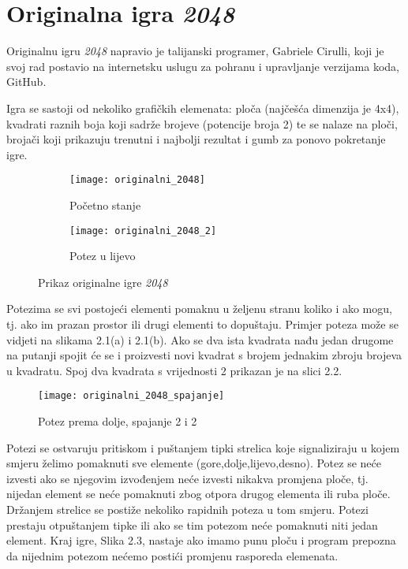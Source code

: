 \section{Originalna igra \textit{2048}}
Originalnu igru \textit{2048} napravio je talijanski programer, Gabriele Cirulli, koji je svoj rad \cite{2048og} postavio na internetsku uslugu za pohranu i upravljanje verzijama koda, GitHub.\par 
Igra se sastoji od nekoliko grafičkih elemenata: ploča (najčešća dimenzija je 4x4), kvadrati raznih boja koji sadrže brojeve (potencije broja 2) te se nalaze na ploči, brojači koji prikazuju trenutni i  najbolji rezultat i gumb za ponovo pokretanje igre.\newline
	\begin{figure}[h]
		\begin{subfigure}{0.5\textwidth}
			\texttt{[image: originalni\_2048]} 
			\caption{Početno stanje}
		\end{subfigure}
		\begin{subfigure}{0.5\textwidth}
			\texttt{[image: originalni\_2048\_2]}
			\caption{Potez u lijevo}
		\end{subfigure}
		
		\caption{Prikaz originalne igre \textit{2048} \cite{2048official}}
	\end{figure}
\newpage 
Potezima se svi postojeći elementi pomaknu u željenu stranu koliko i ako mogu, tj. ako im prazan prostor ili drugi elementi to dopuštaju. Primjer poteza može se vidjeti na slikama 2.1(a) i 2.1(b). Ako se dva ista kvadrata nađu jedan drugome na putanji spojit će se i proizvesti novi kvadrat s brojem jednakim zbroju brojeva u kvadratu. Spoj dva kvadrata s vrijednosti 2 prikazan je na slici 2.2.\newline
\begin{figure}[h]
	\centering
	\texttt{[image: originalni\_2048\_spajanje]}
	\caption{Potez prema dolje, spajanje 2 i 2 \cite{2048official}}
\end{figure}
 \par
Potezi se ostvaruju pritiskom i puštanjem tipki strelica koje signaliziraju u kojem smjeru želimo pomaknuti sve elemente (gore,dolje,lijevo,desno). Potez se neće izvesti ako se njegovim izvođenjem neće izvesti nikakva promjena ploče, tj. nijedan element se neće pomaknuti zbog otpora drugog elementa ili ruba ploče. Držanjem strelice se postiže nekoliko rapidnih poteza u tom smjeru. Potezi prestaju otpuštanjem tipke ili ako se tim potezom neće pomaknuti niti jedan element. Kraj igre, Slika 2.3, nastaje ako imamo punu ploču i program prepozna da nijednim potezom nećemo postići promjenu rasporeda elemenata.\newline
